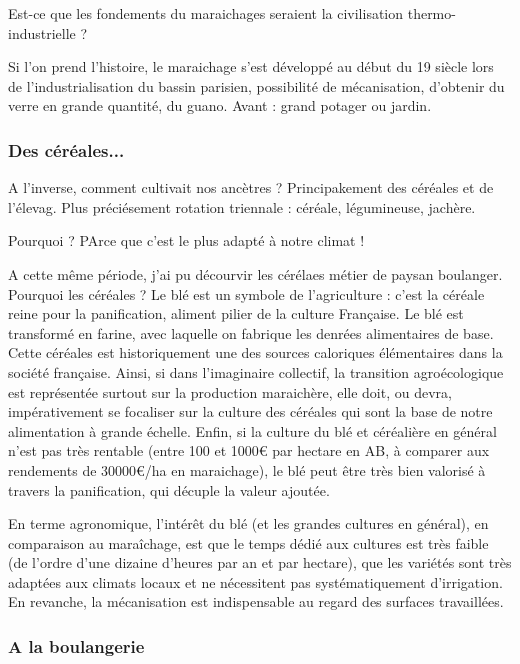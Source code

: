 \documentclass{book}
\begin{document}
Est-ce que les fondements du maraichages seraient la civilisation thermo-industrielle ?

Si l'on prend l'histoire, le maraichage s'est développé au début du 19 siècle lors de l'industrialisation du bassin parisien, possibilité de mécanisation, d'obtenir du verre en grande quantité, du guano. Avant : grand potager ou jardin.

\subsubsection{Des céréales...}

A l'inverse, comment cultivait nos ancètres ? Principakement des céréales et de l'élevag. Plus préciésement rotation triennale : céréale, légumineuse, jachère. 

Pourquoi ? PArce que c'est le plus adapté à notre climat !

A cette même période, j'ai pu décourvir les cérélaes métier de paysan boulanger. Pourquoi les céréales ?
Le blé est un symbole de l'agriculture : c'est la céréale reine pour la panification, aliment pilier de la culture Française. Le blé est transformé en farine, avec laquelle on fabrique les denrées alimentaires de base. Cette céréales est historiquement une des sources caloriques élémentaires dans la société française. Ainsi, si dans l'imaginaire collectif, la transition agroécologique est représentée surtout sur la production maraichère, elle doit, ou devra, impérativement se focaliser sur la culture des céréales qui sont la base de notre alimentation à grande échelle. Enfin, si la culture du blé et céréalière en général n'est pas très rentable (entre 100 et 1000\euro{} par hectare en AB, à comparer aux rendements de 30000\euro{}/ha en maraichage), le blé peut être très bien valorisé à travers la panification, qui décuple la valeur ajoutée. 

En terme agronomique, l'intérêt du blé (et les grandes cultures en général), en comparaison au maraîchage, est que le temps dédié aux cultures est très faible (de l'ordre d'une dizaine d'heures par an et par hectare), que les variétés sont très adaptées aux climats locaux et ne nécessitent pas systématiquement d'irrigation. En revanche, la mécanisation est indispensable au regard des surfaces travaillées. 

\subsubsection{A la boulangerie}
\end{document}
